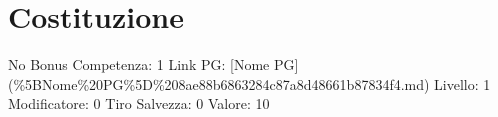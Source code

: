 \section{Costituzione}\label{costituzione}

\begin{description}
\tightlist
\item[Tags: STAT]
No Bonus Competenza: 1 Link PG: {[}Nome PG{]}
(\%5BNome\%20PG\%5D\%208ae88b6863284c87a8d48661b87834f4.md) Livello: 1
Modificatore: 0 Tiro Salvezza: 0 Valore: 10
\end{description}
